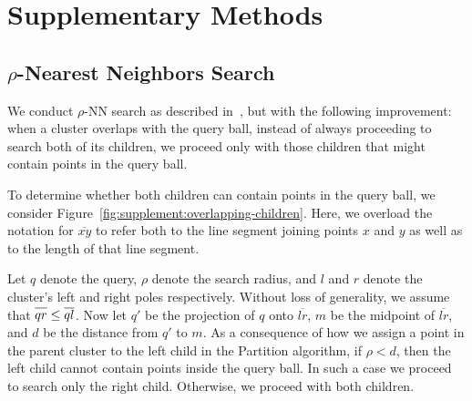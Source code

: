 \documentclass{article}
\begin{document}
\ifarxiv
\else
\ifpdf
{}
\fi
\fi

\maketitle


\section{Supplementary Methods}

\subsection{\texorpdfstring{$\rho$}{p}-Nearest Neighbors Search}

We conduct $\rho$-NN search as described in~\cite{ishaq2019clustered}, but with the following improvement:
when a cluster overlaps with the query ball, instead of always proceeding to search both of its children, we proceed only with those children that might contain points in the query ball.

To determine whether both children can contain points in the query ball, we consider Figure~\ref{fig:supplement:overlapping-children}.
Here, we overload the notation for $\overline{x y}$ to refer both to the line segment joining points $x$ and $y$ as well as to the length of that line segment.

Let $q$ denote the query, $\rho$ denote the search radius, and $l$ and $r$ denote the cluster's left and right poles respectively.
Without loss of generality, we assume that $\overline{q r \vphantom{l}} \leq \overline{q l}$.
Now let $q'$ be the projection of $q$ onto $\overline{l r}$, $m$ be the midpoint of $\overline{l r}$, and $d$ be the distance from $q'$ to $m$.
As a consequence of how we assign a point in the parent cluster to the left child in the Partition algorithm, if $\rho < d$, then the left child cannot contain points inside the query ball.
In such a case we proceed to search only the right child.
Otherwise, we proceed with both children.
\end{document}
